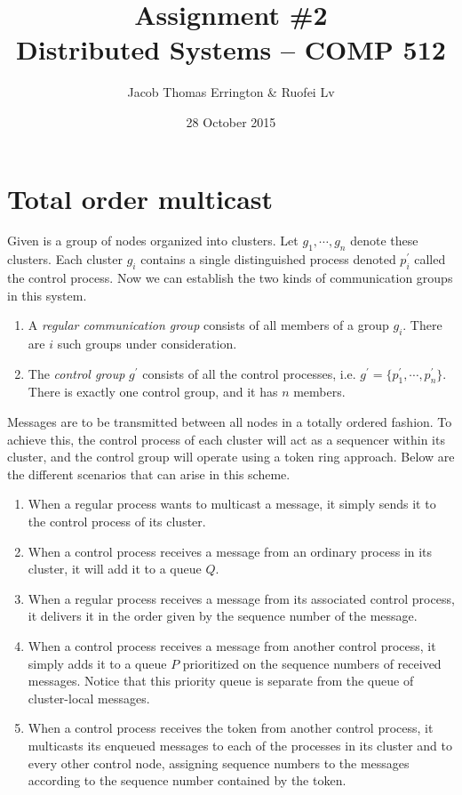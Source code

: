 \documentclass{article}
\author{Jacob Thomas Errington \& Ruofei Lv}
\title{Assignment \#2\\Distributed Systems -- COMP 512}
\date{28 October 2015}
\begin{document}
\maketitle

\section{Total order multicast}

Given is a group of nodes organized into clusters. Let $g_1, \cdots, g_n$
denote these clusters. Each cluster $g_i$ contains a single distinguished
process denoted $p^\prime_i$ called the control process. Now we can establish
the two kinds of communication groups in this system.

\begin{enumerate}
    \item
        A \emph{regular communication group} consists of all members of a group
        $g_i$. There are $i$ such groups under consideration.
    \item
        The \emph{control group} $g^\prime$ consists of all the control
        processes, i.e. $g^\prime = \{p^\prime_1, \cdots, p^\prime_n\}$. There
        is exactly one control group, and it has $n$ members.
\end{enumerate}

Messages are to be transmitted between all nodes in a totally ordered fashion.
To achieve this, the control process of each cluster will act as a sequencer
within its cluster, and the control group will operate using a token ring
approach. Below are the different scenarios that can arise in this scheme.

\begin{enumerate}
    \item When a regular process wants to multicast a message, it simply sends
        it to the control process of its cluster.

    \item When a control process receives a message from an ordinary process in
        its cluster, it will add it to a queue $Q$.

    \item When a regular process receives a message from its associated control
        process, it delivers it in the order given by the sequence number of
        the message.

    \item When a control process receives a message from another control
        process, it simply adds it to a queue $P$ prioritized on the sequence
        numbers of received messages. Notice that this priority queue is
        separate from the queue of cluster-local messages.

    \item When a control process receives the token from another control
        process, it multicasts its enqueued messages to each of the processes
        in its cluster and to every other control node, assigning sequence
        numbers to the messages according to the sequence number contained by
        the token.
\end{enumerate}
\end{document}
